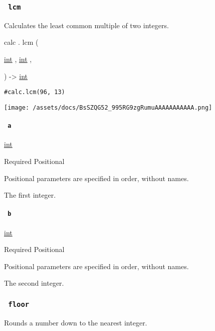 \subsubsection{\texorpdfstring{\texttt{\ lcm\ }}{ lcm }}\label{functions-lcm}

Calculates the least common multiple of two integers.

calc { . } { lcm } (

{ \href{/docs/reference/foundations/int/}{int} , } {
\href{/docs/reference/foundations/int/}{int} , }

) -\textgreater{} \href{/docs/reference/foundations/int/}{int}

\begin{verbatim}
#calc.lcm(96, 13)
\end{verbatim}

\texttt{[image: /assets/docs/BsSZQG52\_995RG9zgRumuAAAAAAAAAAA.png]}

\paragraph{\texorpdfstring{\texttt{\ a\ }}{ a }}\label{functions-lcm-a}

\href{/docs/reference/foundations/int/}{int}

{Required} {{ Positional }}

\label{functions-lcm-a-positional-tooltip}
Positional parameters are specified in order, without names.

The first integer.

\paragraph{\texorpdfstring{\texttt{\ b\ }}{ b }}\label{functions-lcm-b}

\href{/docs/reference/foundations/int/}{int}

{Required} {{ Positional }}

\label{functions-lcm-b-positional-tooltip}
Positional parameters are specified in order, without names.

The second integer.

\subsubsection{\texorpdfstring{\texttt{\ floor\ }}{ floor }}\label{functions-floor}

Rounds a number down to the nearest integer.

